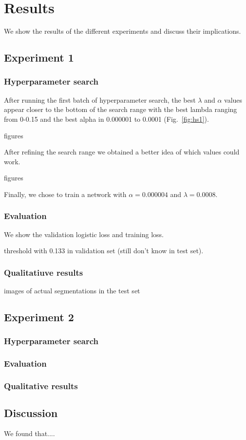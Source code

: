 \chapter{Results}
\label{ch:results}
We show the results of the different experiments and discuss their implications.

\section{Experiment 1}
\subsection{Hyperparameter search}
After running the first batch of hyperparameter search, the best $\lambda$ and $\alpha$ values appear closer to the bottom of the search range with the best lambda ranging from 0-0.15 and the best alpha in 0.000001 to 0.0001 (Fig.~\ref{fig:hs1}).

figures

After refining the search range we obtained a better idea of which values could work. 

figures

Finally, we chose to train a network with $\alpha = 0.000004$ and $\lambda = 0.0008$.

\subsection{Evaluation}
We show the validation logistic loss and training loss.

threshold with 0.133 in validation set (still don't know in test set).

\subsection{Qualitatiuve results}
images of actual segmentations in the test set

\section{Experiment 2}
\subsection{Hyperparameter search}
\subsection{Evaluation}
\subsection{Qualitative results}


\section{Discussion}
We found that....
